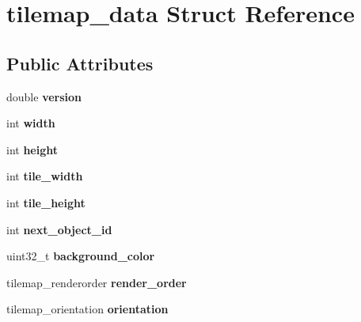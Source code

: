 \hypertarget{structtilemap__data}{}\section{tilemap\+\_\+data Struct Reference}
\label{structtilemap__data}
\subsection*{Public Attributes}
\begin{DoxyCompactItemize}
\item 
\mbox{\label{structtilemap__data_a70bee863e3ced50027b2c1fcde916e75}} 
double {\bfseries version}
\item 
\mbox{\label{structtilemap__data_a1f31c78015bbd747adc5bf41a39ee861}} 
int {\bfseries width}
\item 
\mbox{\label{structtilemap__data_a1a336909b3293190a86631c2a3ad94ce}} 
int {\bfseries height}
\item 
\mbox{\label{structtilemap__data_a1b2dcd5edd89cd2d1ce3d22774d92a52}} 
int {\bfseries tile\+\_\+width}
\item 
\mbox{\label{structtilemap__data_a3cab3a61356617e899ac88ff44c190fa}} 
int {\bfseries tile\+\_\+height}
\item 
\mbox{\label{structtilemap__data_a5a9eff6a4e80246544bef875996b4d0d}} 
int {\bfseries next\+\_\+object\+\_\+id}
\item 
\mbox{\label{structtilemap__data_a6e9208e8141056a6cfaaf0a656ce173b}} 
uint32\+\_\+t {\bfseries background\+\_\+color}
\item 
\mbox{\label{structtilemap__data_a1e9b587759200458e4db7a8d7d6ecd86}} 
tilemap\+\_\+renderorder {\bfseries render\+\_\+order}
\item 
\mbox{\label{structtilemap__data_a3129c2619d9130fb9c5554d1fc9b07cd}} 
tilemap\+\_\+orientation {\bfseries orientation}
\item 

\end{DoxyCompactItemize}
